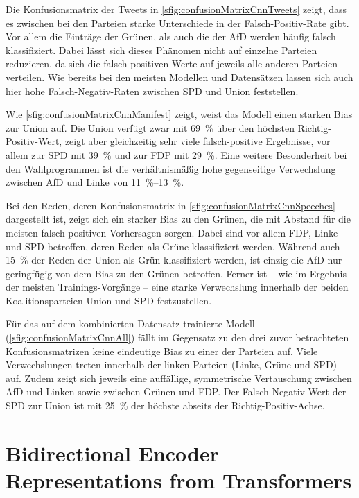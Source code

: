 Die Konfusionsmatrix der Tweets in \autoref{sfig:confusionMatrixCnnTweets} zeigt, dass es zwischen bei den Parteien starke Unterschiede in der Falsch-Positiv-Rate gibt. Vor allem die Einträge der Grünen, als auch die der \ac{AfD} werden häufig falsch klassifiziert. Dabei lässt sich dieses Phänomen nicht auf einzelne Parteien reduzieren, da sich die falsch-positiven Werte auf jeweils alle anderen Parteien verteilen. Wie bereits bei den meisten Modellen und Datensätzen lassen sich auch hier hohe Falsch-Negativ-Raten zwischen \ac{SPD} und Union feststellen.

Wie \autoref{sfig:confusionMatrixCnnManifest} zeigt, weist das Modell einen starken Bias zur Union auf. Die Union verfügt zwar mit \SI{69}{\percent} über den höchsten Richtig-Positiv-Wert, zeigt aber gleichzeitig sehr viele falsch-positive Ergebnisse, vor allem zur \ac{SPD} mit \SI{39}{\percent} und zur \ac{FDP} mit \SI{29}{\percent}. Eine weitere Besonderheit bei den Wahlprogrammen ist die verhältnismäßig hohe gegenseitige Verwechslung zwischen \ac{AfD} und Linke von \SIrange{11}{13}{\percent}.

Bei den Reden, deren Konfusionsmatrix in \autoref{sfig:confusionMatrixCnnSpeeches} dargestellt ist, zeigt sich ein starker Bias zu den Grünen, die mit Abstand für die meisten falsch-positiven Vorhersagen sorgen. Dabei sind vor allem \ac{FDP}, Linke und \ac{SPD} betroffen, deren Reden als Grüne klassifiziert werden. Während auch \SI{15}{\percent} der Reden der Union als Grün klassifiziert werden, ist einzig die \ac{AfD} nur geringfügig von dem Bias zu den Grünen betroffen. Ferner ist -- wie im Ergebnis der meisten Trainings-Vorgänge -- eine starke Verwechslung innerhalb der beiden Koalitionsparteien Union und \ac{SPD} festzustellen.

Für das auf dem kombinierten Datensatz trainierte Modell (\autoref{sfig:confusionMatrixCnnAll}) fällt im Gegensatz zu den drei zuvor betrachteten Konfusionsmatrizen keine eindeutige Bias zu einer der Parteien auf. Viele Verwechslungen treten innerhalb der linken Parteien (Linke, Grüne und \ac{SPD}) auf. Zudem zeigt sich jeweils eine auffällige, symmetrische Vertauschung zwischen \ac{AfD} und Linken sowie zwischen Grünen und \ac{FDP}. Der Falsch-Negativ-Wert der \ac{SPD} zur Union ist mit \SI{25}{\percent} der höchste abseits der Richtig-Positiv-Achse.

\section{Bidirectional Encoder Representations from Transformers} \label{sec:trainingBert}


